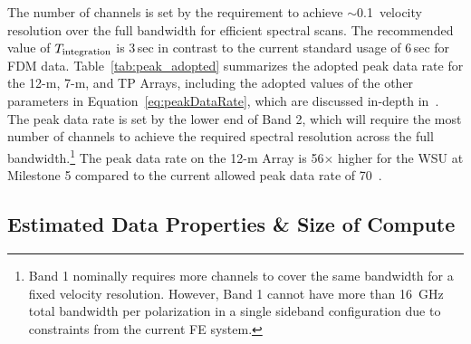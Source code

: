 The number of channels is set by the requirement to achieve $\sim$0.1\kms\ velocity resolution over the full bandwidth for efficient spectral scans. The recommended value of $T_{\rm integration}$ is 3\,sec \cite{drru_peak} in contrast to the current standard usage of 6\,sec for \ac{FDM} data.
Table~\ref{tab:peak_adopted} summarizes the adopted peak data rate for the 12-m, 7-m, and TP Arrays, including
the  adopted values of the other parameters in Equation~\ref{eq:peakDataRate}, which are discussed in-depth in~\cite{drru_peak}. 
The peak data rate is set by the lower end of Band 2, which will require the most number of channels to achieve the required spectral resolution across the full bandwidth.\footnote{Band 1 nominally requires more channels to cover the same bandwidth for a fixed velocity resolution. %
However, Band 1 cannot have more than 16~GHz total bandwidth per polarization in a single sideband configuration due to constraints from the current FE system.} The peak data rate on the 12-m Array is 56$\times$ higher for the WSU at Milestone 5 compared to the current allowed peak data rate of 70~\MBs.




\subsection{Estimated Data Properties \& Size of Compute}
\label{subsec:datarates_prop}


